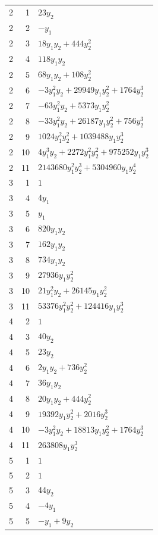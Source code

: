 \documentclass[10pt,a4paper]{article}
\begin{document}
{\begin{longtable}{rrp{125mm}}
2 & 1 & $23 y_{2}$\\
2 & 2 & $- y_{1}$\\
2 & 3 & $18 y_{1} y_{2} + 444 y_{2}^{2}$\\
2 & 4 & $118 y_{1} y_{2}$\\
2 & 5 & $68 y_{1} y_{2} + 108 y_{2}^{2}$\\
2 & 6 & $- 3 y_{1}^{2} y_{2} + 29949 y_{1} y_{2}^{2} + 1764 y_{2}^{3}$\\
2 & 7 & $- 63 y_{1}^{2} y_{2} + 5373 y_{1} y_{2}^{2}$\\
2 & 8 & $- 33 y_{1}^{2} y_{2} + 26187 y_{1} y_{2}^{2} + 756 y_{2}^{3}$\\
2 & 9 & $1024 y_{1}^{2} y_{2}^{2} + 1039488 y_{1} y_{2}^{3}$\\
2 & 10 & $4 y_{1}^{3} y_{2} + 2272 y_{1}^{2} y_{2}^{2} + 975252 y_{1} y_{2}^{3}$\\
2 & 11 & $2143680 y_{1}^{2} y_{2}^{3} + 5304960 y_{1} y_{2}^{4}$\\
3 & 1 & $1$\\
3 & 4 & $4 y_{1}$\\
3 & 5 & $y_{1}$\\
3 & 6 & $820 y_{1} y_{2}$\\
3 & 7 & $162 y_{1} y_{2}$\\
3 & 8 & $734 y_{1} y_{2}$\\
3 & 9 & $27936 y_{1} y_{2}^{2}$\\
3 & 10 & $21 y_{1}^{2} y_{2} + 26145 y_{1} y_{2}^{2}$\\
3 & 11 & $53376 y_{1}^{2} y_{2}^{2} + 124416 y_{1} y_{2}^{3}$\\
4 & 2 & $1$\\
4 & 3 & $40 y_{2}$\\
4 & 5 & $23 y_{2}$\\
4 & 6 & $2 y_{1} y_{2} + 736 y_{2}^{2}$\\
4 & 7 & $36 y_{1} y_{2}$\\
4 & 8 & $20 y_{1} y_{2} + 444 y_{2}^{2}$\\
4 & 9 & $19392 y_{1} y_{2}^{2} + 2016 y_{2}^{3}$\\
4 & 10 & $- 3 y_{1}^{2} y_{2} + 18813 y_{1} y_{2}^{2} + 1764 y_{2}^{3}$\\
4 & 11 & $263808 y_{1} y_{2}^{3}$\\
5 & 1 & $1$\\
5 & 2 & $1$\\
5 & 3 & $44 y_{2}$\\
5 & 4 & $- 4 y_{1}$\\
5 & 5 & $- y_{1} + 9 y_{2}$\\

\end{longtable}}
\end{document}

